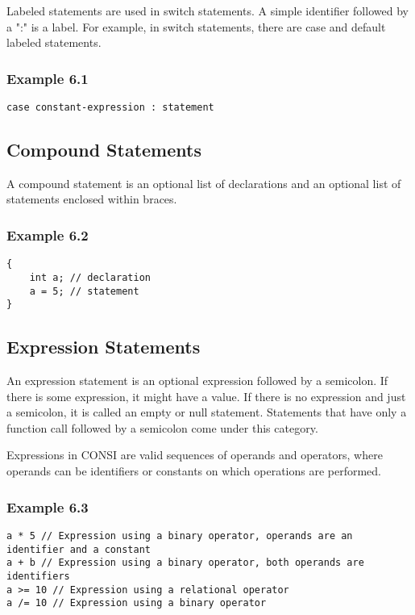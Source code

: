 \documentclass[12pt]{fphw}
\begin{document}
Labeled statements are used in switch statements. A simple identifier followed by a ":" is a label. For example, in switch statements, there are case and default labeled statements.

\subsubsection*{Example 6.1}
\begin{verbatim}
case constant-expression : statement
\end{verbatim}

\subsection{Compound Statements}

A compound statement is an optional list of declarations and an optional list of statements enclosed within braces.

\subsubsection*{Example 6.2}
\begin{verbatim}
{
    int a; // declaration
    a = 5; // statement
}
\end{verbatim}

\subsection{Expression Statements}

An expression statement is an optional expression followed by a semicolon. If there is some expression, it might have a value. If there is no expression and just a semicolon, it is called an empty or null statement. Statements that have only a function call followed by a semicolon come under this category.

Expressions in CONSI are valid sequences of operands and operators, where operands can be identifiers or constants on which operations are performed.

\subsubsection*{Example 6.3}
\begin{verbatim}
a * 5 // Expression using a binary operator, operands are an identifier and a constant
a + b // Expression using a binary operator, both operands are identifiers
a >= 10 // Expression using a relational operator
a /= 10 // Expression using a binary operator
\end{verbatim}
\end{document}
